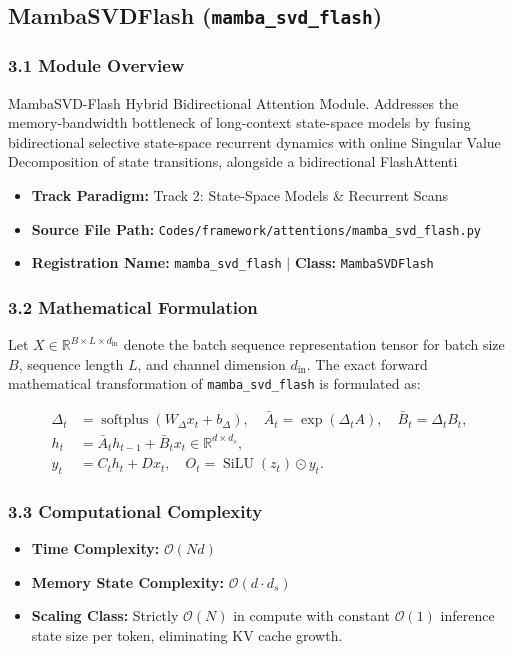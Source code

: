 \subsection{MambaSVDFlash (\texttt{mamba\_svd\_flash})}
\label{sec:app_module_mamba_svd_flash}

\subsubsection*{3.1 Module Overview}
MambaSVD-Flash Hybrid Bidirectional Attention Module.  Addresses the memory-bandwidth bottleneck of long-context state-space models by fusing  bidirectional selective state-space recurrent dynamics with online Singular Value Decomposition of  state transitions, alongside a bidirectional FlashAttenti
\begin{itemize}
    \item \textbf{Track Paradigm:} Track 2: State-Space Models & Recurrent Scans
    \item \textbf{Source File Path:} \texttt{Codes/framework/attentions/mamba\_svd\_flash.py}
    \item \textbf{Registration Name:} \texttt{mamba\_svd\_flash} $\mid$ \textbf{Class:} \texttt{MambaSVDFlash}
\end{itemize}

\subsubsection*{3.2 Mathematical Formulation}
Let $X \in \mathbb{R}^{B \times L \times d_{\text{in}}}$ denote the batch sequence representation tensor for batch size $B$, sequence length $L$, and channel dimension $d_{\text{in}}$. The exact forward mathematical transformation of \texttt{mamba\_svd\_flash} is formulated as:

\begin{align}
\Delta_t &= \operatorname{softplus}(W_\Delta x_t + b_\Delta), \quad \bar{A}_t = \exp(\Delta_t A), \quad \bar{B}_t = \Delta_t B_t, \\
h_t &= \bar{A}_t h_{t-1} + \bar{B}_t x_t \in \mathbb{R}^{d \times d_s}, \\
y_t &= C_t h_t + D x_t, \quad O_t = \operatorname{SiLU}(z_t) \odot y_t.
\end{align}


\subsubsection*{3.3 Computational Complexity}
\begin{itemize}
    \item \textbf{Time Complexity:} $\mathcal{O}(N d)$
    \item \textbf{Memory State Complexity:} $\mathcal{O}(d \cdot d_s)$
    \item \textbf{Scaling Class:} Strictly $\mathcal{O}(N)$ in compute with constant $\mathcal{O}(1)$ inference state size per token, eliminating KV cache growth.
\end{itemize}

